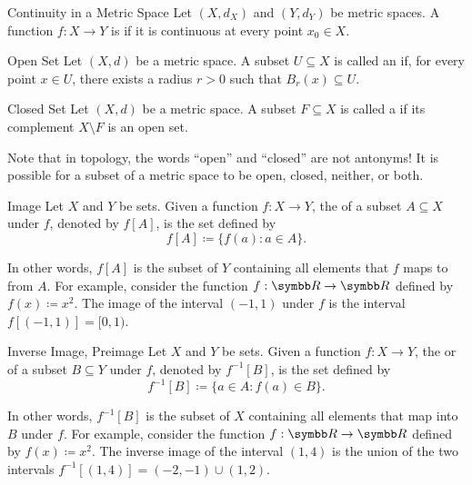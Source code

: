 \documentclass[12pt]{article}
\begin{document}
\begin{dfnbox}{Continuity in a Metric Space}
	Let $(X, d_X)$ and $(Y, d_Y)$ be metric spaces. A function $f: X \to Y$ is  if it is continuous at every point $x_0 \in X$.
\end{dfnbox}

\begin{dfnbox}{Open Set}
	Let $(X, d)$ be a metric space. A subset $U \subseteq X$ is called an  if, for every point $x \in U$, there exists a radius $r > 0$ such that $B_r(x) \subseteq U$.
\end{dfnbox}

\begin{dfnbox}{Closed Set}
	Let $(X, d)$ be a metric space. A subset $F \subseteq X$ is called a  if its complement $X \setminus F$ is an open set.
\end{dfnbox}

Note that in topology, the words ``open'' and ``closed'' are not antonyms! It is possible for a subset of a metric space to be open, closed, neither, or both.

\begin{dfnbox}{Image}
	Let $X$ and $Y$ be sets. Given a function $f: X \to Y$, the  of a subset $A \subseteq X$ under $f$, denoted by $f[A]$, is the set defined by
	\[ f[A] \coloneq \{ f(a) : a \in A \}. \]
\end{dfnbox}

In other words, $f[A]$ is the subset of $Y$ containing all elements that $f$ maps to from $A$. For example, consider the function $f: \R \to \R$ defined by $f(x) \coloneq x^2$. The image of the interval $(-1, 1)$ under $f$ is the interval $f[(-1, 1)] = [0, 1)$.

\begin{dfnbox}{Inverse Image, Preimage}
	Let $X$ and $Y$ be sets. Given a function $f: X \to Y$, the  or  of a subset $B \subseteq Y$ under $f$, denoted by $f^{-1}[B]$, is the set defined by
	\[ f^{-1}[B] \coloneq \{ a \in A : f(a) \in B \}. \]
\end{dfnbox}

In other words, $f^{-1}[B]$ is the subset of $X$ containing all elements that map into $B$ under $f$. For example, consider the function $f: \R \to \R$ defined by $f(x) \coloneq x^2$. The inverse image of the interval $(1, 4)$ is the union of the two intervals $f^{-1}[(1, 4)] = (-2, -1) \cup (1, 2)$.
\end{document}
